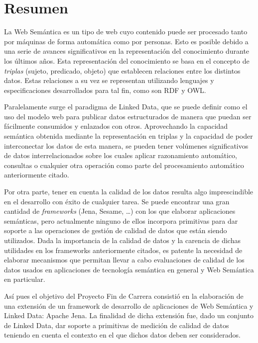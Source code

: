 \chapter{Resumen}


La Web Semántica es un tipo de web cuyo contenido puede ser procesado tanto por
máquinas de forma automática como por personas. Esto es posible debido a una serie de avances significativos en
la representación del conocimiento durante los últimos años. Esta
representación del conocimiento se basa en el concepto de \textit{triplas} (sujeto,
predicado, objeto) que establecen relaciones entre los distintos datos. Estas
relaciones a su vez se representan utilizando lenguajes y especificaciones
desarrollados para tal fin, como son \acf{RDF} y \acf{OWL}. 

Paralelamente surge el paradigma de Linked Data, que se puede definir como el
uso del modelo web para publicar datos estructurados de manera que puedan ser
fácilmente consumidos y enlazados con otros. Aprovechando la capacidad
semántica obtenida mediante la representación en triplas y la capacidad de poder
interconectar los datos de esta manera, se pueden tener volúmenes significativos de
datos interrelacionados sobre los cuales aplicar razonamiento automático,
consultas o cualquier otra operación como parte del procesamiento automático
anteriormente citado. 

Por otra parte, tener en cuenta la calidad de los datos resulta algo
imprescindible en el desarrollo con éxito de cualquier tarea. Se puede encontrar
una gran cantidad de \textit{frameworks} (Jena, Sesame, \ldots) con los que elaborar
aplicaciones semánticas, pero actualmente ninguno de ellos
incorpora primitivas para dar soporte a las operaciones de gestión de calidad de
datos que están siendo utilizados. Dada la importancia de la calidad de datos y
la carencia de dichas utilidades en los frameworks anteriormente citados, es
patente la necesidad de elaborar mecanismos que permitan llevar a cabo evaluaciones de
calidad de los datos usados en aplicaciones de tecnología semántica en general y
Web Semántica en particular.

Así pues el objetivo del Proyecto Fin de Carrera consistió en la elaboración de una extensión de un framework de desarrollo
de aplicaciones de Web Semántica y Linked Data: Apache Jena. La finalidad de
dicha extensión fue, dado un conjunto de Linked Data, dar soporte a primitivas
de medición de calidad de datos teniendo en cuenta el contexto en el que dichos
datos deben ser considerados.

